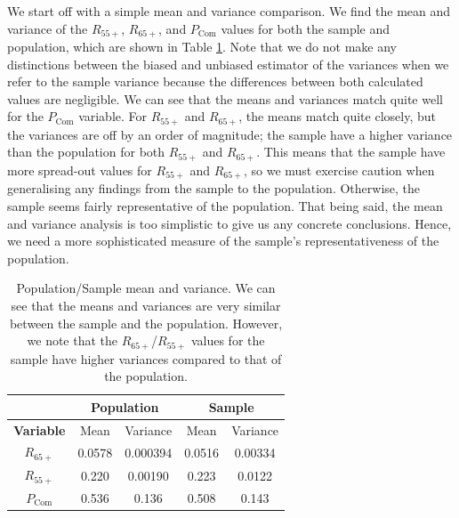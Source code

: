 \documentclass[11pt]{article}
\begin{document}
We start off with a simple mean and variance comparison.  We find the mean and variance of the  $R_{55+}$, $R_{65+}$, and $P_{\text{Com}}$ values for both the sample and population, which are shown in Table \ref{tab:mean and variance}. Note that we do not make any distinctions between the biased and unbiased estimator of the variances when we refer to the sample variance because the differences between both calculated values are negligible. We can see that the means and variances match quite well for the $P_{\text{Com}}$ variable. For  $R_{55+}$ and $R_{65+}$, the means match quite closely, but the variances are off by an order of magnitude; the sample have a higher variance than the population for both $R_{55+}$ and $R_{65+}$. This means that the sample have more spread-out values for $R_{55+}$ and $R_{65+}$, so we must exercise caution when generalising any findings from the sample to the population. Otherwise, the sample seems fairly representative of the population. That being said, the mean and variance analysis is too simplistic to give us any concrete conclusions. Hence, we need a more sophisticated measure of the sample's representativeness of the population.


\begin{table}[]
\centering
\begin{tabular}{@{}ccccc@{}}
\toprule
\multicolumn{1}{l}{} & \multicolumn{2}{c}{\textbf{Population}} & \multicolumn{2}{c}{\textbf{Sample}} \\ \midrule
\textbf{Variable}    & Mean              & Variance            & Mean            & Variance          \\ \midrule
$R_{65+}$                   & 0.0578            & 0.000394            & 0.0516          & 0.00334           \\
$R_{55+}$                   & 0.220             & 0.00190             & 0.223           & 0.0122            \\
$P_{\text{Com}}$                 & 0.536             & 0.136               & 0.508           & 0.143            \\ \bottomrule
\end{tabular}
\caption{Population/Sample mean and variance. We can see that the means and variances are very similar between the sample and the population. However, we note that the $R_{65+}$/$R_{55+}$ values for the sample have higher variances compared to that of the population.}
\label{tab:mean and variance}
\end{table}
\end{document}
